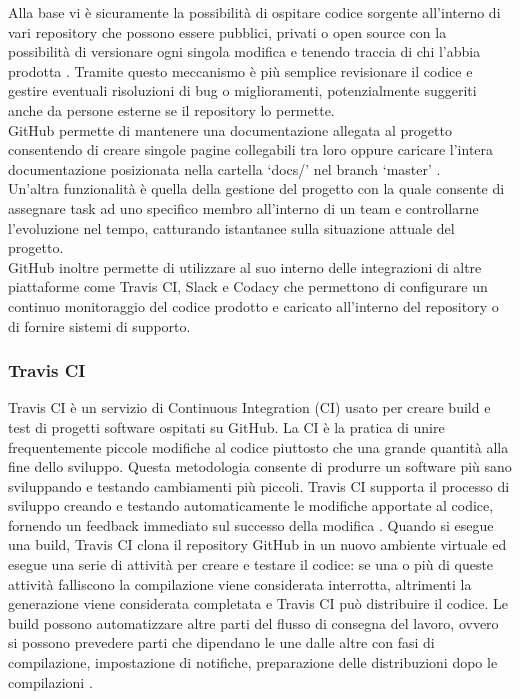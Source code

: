 Alla base vi è sicuramente la possibilità di ospitare codice sorgente all'interno di vari repository che possono essere pubblici, privati o open source con la possibilità di versionare ogni singola modifica e tenendo traccia di chi l'abbia prodotta \cite{GitHub}.
Tramite questo meccanismo è più semplice revisionare il codice e gestire eventuali risoluzioni di bug o miglioramenti, potenzialmente suggeriti anche da persone esterne se il repository lo permette.
\\
GitHub permette di mantenere una documentazione allegata al progetto consentendo di creare singole pagine collegabili tra loro oppure caricare l'intera documentazione posizionata nella cartella `docs/' nel branch `master' \cite{GitHub}.
\\
Un'altra funzionalità è quella della gestione del progetto con la quale consente di assegnare task ad uno specifico membro all'interno di un team e controllarne l'evoluzione nel tempo, catturando istantanee sulla situazione attuale del progetto.
\\
GitHub inoltre permette di utilizzare al suo interno delle integrazioni di altre piattaforme come Travis CI,  Slack e Codacy che permettono di configurare un continuo monitoraggio del codice prodotto e caricato all'interno del repository o di fornire sistemi di supporto.

\subsubsection{Travis CI}
Travis CI è un servizio di Continuous Integration (CI) usato per creare build e test di progetti software ospitati su GitHub.
La CI è la pratica di unire frequentemente piccole modifiche al codice piuttosto che una grande quantità alla fine dello sviluppo. Questa metodologia consente di produrre un software più sano sviluppando e testando cambiamenti più piccoli.
Travis CI supporta il processo di sviluppo creando e testando automaticamente le modifiche apportate al codice, fornendo un feedback immediato sul successo della modifica \cite{TravisCI}.
Quando si esegue una build, Travis CI clona il repository GitHub in un nuovo ambiente virtuale ed esegue una serie di attività per creare e testare il codice: se una o più di queste attività falliscono la compilazione viene considerata interrotta, altrimenti la generazione viene considerata completata e Travis CI può distribuire il codice.
Le build possono automatizzare altre parti del flusso di consegna del lavoro, ovvero si possono prevedere parti che dipendano le une dalle altre con fasi di compilazione, impostazione di notifiche, preparazione delle distribuzioni dopo le compilazioni \cite{TravisCI}.



